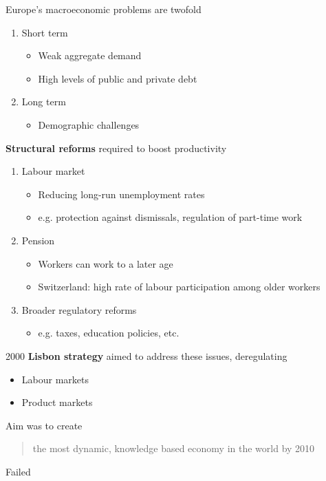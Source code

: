 \documentclass{beamer}
\begin{document}
\begin{frame}
 Europe's macroeconomic problems are twofold  
 \medskip
\begin{enumerate}
  \item Short term
  \begin{itemize}
    \item Weak aggregate demand
    \item High levels of public and private debt
  \end{itemize}
  \medskip
  \item Long term
  \begin{itemize}
    \item Demographic challenges  
  \end{itemize}    
\end{enumerate}
\end{frame}

\begin{frame}
  \textbf{Structural reforms} required to boost productivity
  \begin{enumerate}
  \item Labour market
  \begin{itemize}
    \item Reducing long-run unemployment rates
    \item e.g. protection against dismissals, regulation of part-time work
  \end{itemize}
  \item Pension
  \begin{itemize}
    \item Workers can work to a later age
    \item Switzerland: high rate of labour participation among older workers
  \end{itemize}
  \item Broader regulatory reforms
  \begin{itemize}
    \item e.g. taxes, education policies, etc. 
  \end{itemize}
\end{enumerate}
\end{frame}

\begin{frame}
  2000 \textbf{Lisbon strategy} aimed to address these issues, deregulating 
  \begin{itemize}
    \item Labour markets
    \item Product markets
  \end{itemize}
  \medskip
  Aim was to create
  \begin{quote}
    the most dynamic, knowledge based economy in the world by 2010  
  \end{quote}
  \medskip
  Failed  
\end{frame}
\end{document}
